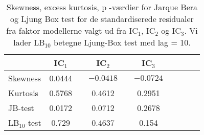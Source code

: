\begin{table}
\center
\begin{tabular}{lccccccccc} \toprule
& IC$_1$ & & IC$_2$ & &IC$_3$ \\ \midrule
Skewness & 0.0444 & & $-0.0418$  & & $-0.0724$   \\
Kurtosis & 0.5768 & & 0.4612  & & 0.2951 \\
JB-test & 0.0172 & & 0.0712  & & 0.2678 \\ 
LB$_{10}$-test & 0.729  && 0.4637 && 0.154 \\ \bottomrule
\end{tabular}
\caption{Skewness, excess kurtosis, p -værdier for Jarque Bera og Ljung Box test for de standardiserede residualer fra faktor modellerne valgt ud fra IC$_1$, IC$_2$ og IC$_3$. Vi lader LB$_{10}$ betegne Ljung-Box test med lag = 10. } \label{tab:test_faktor}
\end{table}